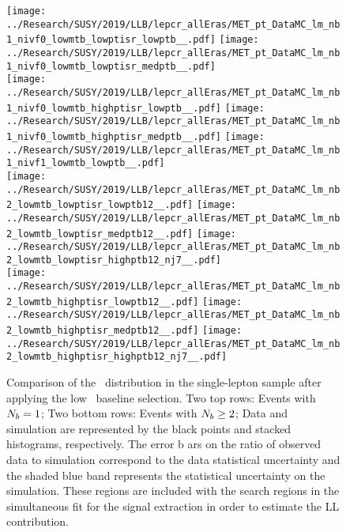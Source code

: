 \begin{figure}[!htb]
	\begin{center}  
		\texttt{[image: ../Research/SUSY/2019/LLB/lepcr\_allEras/MET\_pt\_DataMC\_lm\_nb1\_nivf0\_lowmtb\_lowptisr\_lowptb\_\_.pdf]}
		\texttt{[image: ../Research/SUSY/2019/LLB/lepcr\_allEras/MET\_pt\_DataMC\_lm\_nb1\_nivf0\_lowmtb\_lowptisr\_medptb\_\_.pdf]} \\
		\texttt{[image: ../Research/SUSY/2019/LLB/lepcr\_allEras/MET\_pt\_DataMC\_lm\_nb1\_nivf0\_lowmtb\_highptisr\_lowptb\_\_.pdf]}
		\texttt{[image: ../Research/SUSY/2019/LLB/lepcr\_allEras/MET\_pt\_DataMC\_lm\_nb1\_nivf0\_lowmtb\_highptisr\_medptb\_\_.pdf]}
		\texttt{[image: ../Research/SUSY/2019/LLB/lepcr\_allEras/MET\_pt\_DataMC\_lm\_nb1\_nivf1\_lowmtb\_lowptb\_\_.pdf]} \\
		\texttt{[image: ../Research/SUSY/2019/LLB/lepcr\_allEras/MET\_pt\_DataMC\_lm\_nb2\_lowmtb\_lowptisr\_lowptb12\_\_.pdf]} 
		\texttt{[image: ../Research/SUSY/2019/LLB/lepcr\_allEras/MET\_pt\_DataMC\_lm\_nb2\_lowmtb\_lowptisr\_medptb12\_\_.pdf]}
		\texttt{[image: ../Research/SUSY/2019/LLB/lepcr\_allEras/MET\_pt\_DataMC\_lm\_nb2\_lowmtb\_lowptisr\_highptb12\_nj7\_\_.pdf]} \\
		\texttt{[image: ../Research/SUSY/2019/LLB/lepcr\_allEras/MET\_pt\_DataMC\_lm\_nb2\_lowmtb\_highptisr\_lowptb12\_\_.pdf]} 
		\texttt{[image: ../Research/SUSY/2019/LLB/lepcr\_allEras/MET\_pt\_DataMC\_lm\_nb2\_lowmtb\_highptisr\_medptb12\_\_.pdf]}
		\texttt{[image: ../Research/SUSY/2019/LLB/lepcr\_allEras/MET\_pt\_DataMC\_lm\_nb2\_lowmtb\_highptisr\_highptb12\_nj7\_\_.pdf]} \\
	\end{center}
	\caption{Comparison of the \met~distribution in the single-lepton sample after applying the low \dm~baseline selection. Two top rows: Events with $N_{b}=1$; Two bottom rows: Events with $N_{b} \geq2$;  Data and simulation are represented by the black points and stacked histograms, respectively. The error b    ars on the ratio of observed data to simulation correspond to the data statistical uncertainty and the shaded blue band represents the statistical uncertainty on the simulation. These regions are included with the search regions in the simultaneous fit for the signal extraction in order to estimate the LL contribution.
	 }
	\label{fig:llb-1lcr-datavsmc-lm-nb1}
\end{figure}
